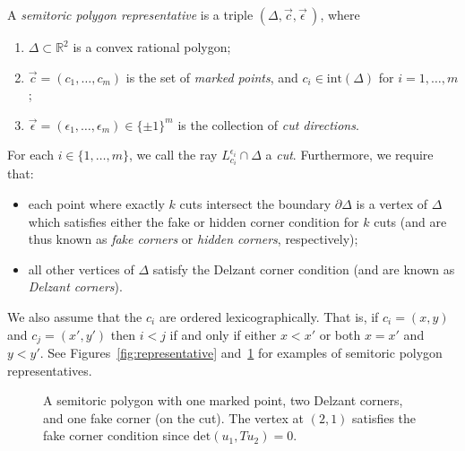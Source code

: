 \documentclass[10pt,a4paper]{amsart}
\numberwithin{equation}{section}
\newcommand{\De}{\Delta}
\newcommand{\strep}{(\De,\vec{c},\vec{\epsilon}\,)}
\theoremstyle{definition}
\theoremstyle{plain}
\theoremstyle{plain}
\begin{document}
\begin{Definition}\label{def:stpoly-representative} A \emph{semitoric polygon representative} is a triple $\strep$, where
\begin{enumerate}\itemsep=0pt
 \item[(1)] $\Delta \subset \mathbb{R}^{2}$ is a convex rational polygon;
 \item[(2)] $\vec c = (c_1,\dots,c_m)$ is the set of \emph{marked points}, and $c_i \in \textrm{int}(\Delta)$ for $i = 1,\dots,m$;
 \item[(3)] $\vec{\epsilon} = (\epsilon_1,\dots,\epsilon_m) \in \{ \pm1 \}^m$ is the collection of \emph{cut directions}.
\end{enumerate}
For each $i\in\{1,\ldots,m\}$, we call the ray $L_{c_i}^{\epsilon_i}\cap\Delta$ a \emph{cut}.
Furthermore, we require that:
 \begin{itemize}\itemsep=0pt
 \item each point where exactly $k$ cuts intersect the boundary $\partial \Delta$ is a vertex of $\Delta$ which satisfies either the fake or hidden corner condition for $k$ cuts (and are thus known as \emph{fake corners} or \emph{hidden corners}, respectively);
 \item all other vertices of $\Delta$ satisfy the Delzant corner condition (and are known as \emph{Delzant corners}).
 \end{itemize}
\end{Definition}





We also assume that the $c_i$ are ordered lexicographically. That is, if $c_i = (x,y)$ and $c_j = (x',y')$ then $i<j$ if and only if either $x<x'$ or both $x=x'$ and $y < y'$.
See Figures~\ref{fig:representative} and~\ref{fig:sem1} for examples of semitoric polygon representatives.

 \begin{figure}
 \begin{center}
 \caption{A semitoric polygon with one marked point, two Delzant corners, and one fake corner (on the cut). The vertex at $(2,1)$ satisfies the fake corner condition since $\mathrm{det}(u_1,Tu_2) = 0$.}
 \label{fig:sem1}
 \end{center}
 \end{figure}
\end{document}
